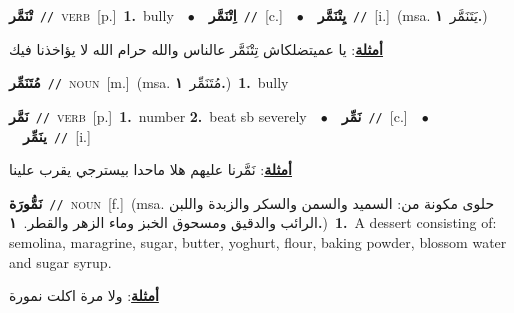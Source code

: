 \documentclass[10pt,a4paper,twoside]{article} %
\begin{document}
\begin{multicols}{2}
{\setlength\topsep{0pt}\textbf{\foreignlanguage{arabic}{تْنَمَّر}}\ {\color{gray}\texttt{//}\color{black}}\ \textsc{verb}\ [p.]\ \textbf{1.}~bully\ \ $\bullet$\ \ \setlength\topsep{0pt}\textbf{\foreignlanguage{arabic}{اِتْنَمَّر}}\ {\color{gray}\texttt{//}\color{black}}\ [c.]\ \ $\bullet$\ \ \setlength\topsep{0pt}\textbf{\foreignlanguage{arabic}{يِتْنَمَّر}}\ {\color{gray}\texttt{//}\color{black}}\ [i.]\ \color{gray}(msa. \foreignlanguage{arabic}{يَتَنَمَّر}~\foreignlanguage{arabic}{\textbf{١.}})\color{black}\  \begin{flushright}\color{gray}\foreignlanguage{arabic}{\textbf{\underline{\foreignlanguage{arabic}{أمثلة}}}: يا عميتضلكاش تِتْنَمَّر عالناس والله حرام الله لا يؤاخذنا فيك}\end{flushright}\color{black}} \vspace{2mm}

{\setlength\topsep{0pt}\textbf{\foreignlanguage{arabic}{مُتَنَمِّر}}\ {\color{gray}\texttt{//}\color{black}}\ \textsc{noun}\ [m.]\ \color{gray}(msa. \foreignlanguage{arabic}{مُتَنَمِّر}~\foreignlanguage{arabic}{\textbf{١.}})\color{black}\ \textbf{1.}~bully\ } \vspace{2mm}

{\setlength\topsep{0pt}\textbf{\foreignlanguage{arabic}{نَمَّر}}\ {\color{gray}\texttt{//}\color{black}}\ \textsc{verb}\ [p.]\ \textbf{1.}~number  \textbf{2.}~beat sb severely\ \ $\bullet$\ \ \setlength\topsep{0pt}\textbf{\foreignlanguage{arabic}{نَمِّر}}\ {\color{gray}\texttt{//}\color{black}}\ [c.]\ \ $\bullet$\ \ \setlength\topsep{0pt}\textbf{\foreignlanguage{arabic}{ينَمِّر}}\ {\color{gray}\texttt{//}\color{black}}\ [i.]\  \begin{flushright}\color{gray}\foreignlanguage{arabic}{\textbf{\underline{\foreignlanguage{arabic}{أمثلة}}}: نَمَّرنا عليهم هلا ماحدا بيسترجي يقرب علينا}\end{flushright}\color{black}} \vspace{2mm}

{\setlength\topsep{0pt}\textbf{\foreignlanguage{arabic}{نَمُّورَة}}\ {\color{gray}\texttt{//}\color{black}}\ \textsc{noun}\ [f.]\ \color{gray}(msa. \foreignlanguage{arabic}{حلوى مكونة من: السميد والسمن والسكر والزبدة واللبن الرائب والدقيق ومسحوق الخبز وماء الزهر والقطر.}~\foreignlanguage{arabic}{\textbf{١.}})\color{black}\ \textbf{1.}~A dessert consisting of: semolina, maragrine, sugar, butter, yoghurt, flour, baking powder, blossom water and sugar syrup.\  \begin{flushright}\color{gray}\foreignlanguage{arabic}{\textbf{\underline{\foreignlanguage{arabic}{أمثلة}}}: ولا مرة اكلت نمورة}\end{flushright}\color{black}} \vspace{2mm}


\end{multicols}
\end{document}
